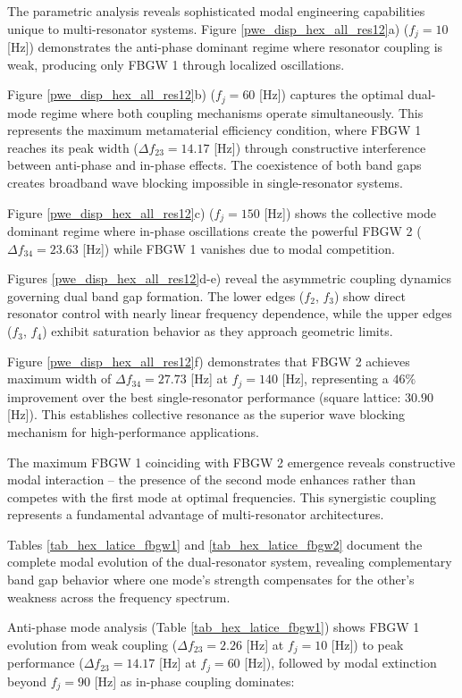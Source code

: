 \documentclass[review,numbers,sort&compress]{elsarticle}
\begin{document}
The parametric analysis reveals sophisticated modal engineering capabilities unique to multi-resonator systems. Figure \ref{pwe_disp_hex_all_res12}a) ($f_j = 10$ [Hz]) demonstrates the anti-phase dominant regime where resonator coupling is weak, producing only FBGW 1 through localized oscillations.

Figure \ref{pwe_disp_hex_all_res12}b) ($f_j = 60$ [Hz]) captures the optimal dual-mode regime where both coupling mechanisms operate simultaneously. This represents the maximum metamaterial efficiency condition, where FBGW 1 reaches its peak width ($\Delta f_{23} = 14.17$ [Hz]) through constructive interference between anti-phase and in-phase effects. The coexistence of both band gaps creates broadband wave blocking impossible in single-resonator systems.

Figure \ref{pwe_disp_hex_all_res12}c) ($f_j = 150$ [Hz]) shows the collective mode dominant regime where in-phase oscillations create the powerful FBGW 2 ($\Delta f_{34} = 23.63$ [Hz]) while FBGW 1 vanishes due to modal competition.

Figures \ref{pwe_disp_hex_all_res12}d-e) reveal the asymmetric coupling dynamics governing dual band gap formation. The lower edges ($f_2$, $f_3$) show direct resonator control with nearly linear frequency dependence, while the upper edges ($f_3$, $f_4$) exhibit saturation behavior as they approach geometric limits.

Figure \ref{pwe_disp_hex_all_res12}f) demonstrates that FBGW 2 achieves maximum width of $\Delta f_{34} = 27.73$ [Hz] at $f_j = 140$ [Hz], representing a $46\%$ improvement over the best single-resonator performance (square lattice: $30.90$ [Hz]). This establishes collective resonance as the superior wave blocking mechanism for high-performance applications.

The maximum FBGW 1 coinciding with FBGW 2 emergence reveals constructive modal interaction – the presence of the second mode enhances rather than competes with the first mode at optimal frequencies. This synergistic coupling represents a fundamental advantage of multi-resonator architectures.


Tables \ref{tab_hex_latice_fbgw1} and \ref{tab_hex_latice_fbgw2} document the complete modal evolution of the dual-resonator system, revealing complementary band gap behavior where one mode's strength compensates for the other's weakness across the frequency spectrum.

Anti-phase mode analysis (Table \ref{tab_hex_latice_fbgw1}) shows FBGW 1 evolution from weak coupling ($\Delta f_{23} = 2.26$ [Hz] at $f_j = 10$ [Hz]) to peak performance ($\Delta f_{23} = 14.17$ [Hz] at $f_j = 60$ [Hz]), followed by modal extinction beyond $f_j = 90$ [Hz] as in-phase coupling dominates:
\end{document}
